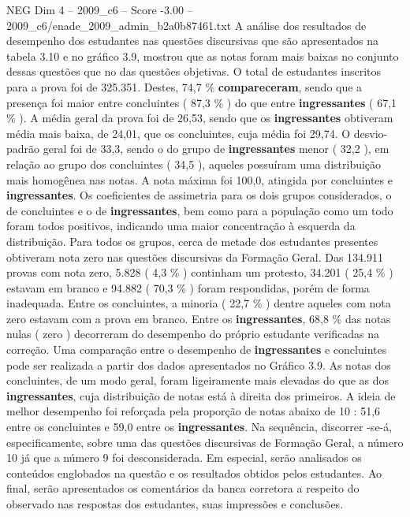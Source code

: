 \begin{textsample}{NEG Dim 4 – 2009\_c6 – Score -3.00 – 2009\_c6/enade\_2009\_admin\_b2a0b87461.txt}
A análise dos resultados de desempenho dos estudantes nas questões discursivas que são apresentados na tabela 3.10 e no gráfico 3.9, mostrou que as notas foram mais baixas no conjunto dessas questões que no das questões objetivas.
O total de estudantes inscritos para a prova foi de 325.351.
Destes, 74,7 \% \textbf{compareceram}, sendo que a presença foi maior entre concluintes ( 87,3 \% ) do que entre \textbf{ingressantes} ( 67,1 \% ).
A média geral da prova foi de 26,53, sendo que os \textbf{ingressantes} obtiveram média mais baixa, de 24,01, que os concluintes, cuja média foi 29,74.
O desvio-padrão geral foi de 33,3, sendo o do grupo de \textbf{ingressantes} menor ( 32,2 ), em relação ao grupo dos concluintes ( 34,5 ), aqueles possuíram uma distribuição mais homogênea nas notas.
A nota máxima foi 100,0, atingida por concluintes e \textbf{ingressantes}.
Os coeficientes de assimetria para os dois grupos considerados, o de concluintes e o de \textbf{ingressantes}, bem como para a população como um todo foram todos positivos, indicando uma maior concentração à esquerda da distribuição.
Para todos os grupos, cerca de metade dos estudantes presentes obtiveram nota zero nas questões discursivas da Formação Geral.
Das 134.911 provas com nota zero, 5.828 ( 4,3 \% ) continham um protesto, 34.201 ( 25,4 \% ) estavam em branco e 94.882 ( 70,3 \% ) foram respondidas, porém de forma inadequada.
Entre os concluintes, a minoria ( 22,7 \% ) dentre aqueles com nota zero estavam com a prova em branco.
Entre os \textbf{ingressantes}, 68,8 \% das notas nulas ( zero ) decorreram do desempenho do próprio estudante verificadas na correção.
Uma comparação entre o desempenho de \textbf{ingressantes} e concluintes pode ser realizada a partir dos dados apresentados no Gráfico 3.9.
As notas dos concluintes, de um modo geral, foram ligeiramente mais elevadas do que as dos \textbf{ingressantes}, cuja distribuição de notas está à direita dos primeiros.
A ideia de melhor desempenho foi reforçada pela proporção de notas abaixo de 10 : 51,6 entre os concluintes e 59,0 entre os \textbf{ingressantes}.
Na sequência, discorrer -se-á, especificamente, sobre uma das questões discursivas de Formação Geral, a número 10 já que a número 9 foi desconsiderada.
Em especial, serão analisados os conteúdos englobados na questão e os resultados obtidos pelos estudantes.
Ao final, serão apresentados os comentários da banca corretora a respeito do observado nas respostas dos estudantes, suas impressões e conclusões.

\end{textsample}
